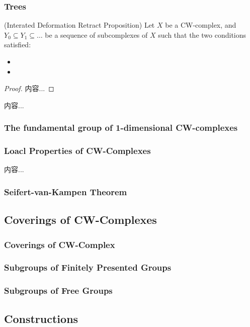 \documentclass[Total.tex]{subfiles}
\begin{document}
	\subsubsection{Trees}
	\begin{proposition}
		(Interated Deformation Retract Proposition) Let $X$ be a CW-complex, and $Y_0\subseteq Y_1\subseteq \dots$ be a sequence of subcomplexes of $X$ such that the two conditions satisfied:
		\begin{itemize}
			\item 
			\item 
		\end{itemize}
	\end{proposition}
	\begin{proof}
		内容...
	\end{proof}
	\begin{Def}
		内容...
	\end{Def}
	\subsubsection{The fundamental group of 1-dimensional CW-complexes}
	\subsubsection{Loacl Properties of CW-Complexes}
	\begin{proposition}
		内容...
	\end{proposition}
	\subsubsection{Seifert-van-Kampen Theorem}
	\subsection{Coverings of CW-Complexes}
	\subsubsection{Coverings of CW-Complex}
	\subsubsection{Subgroups of Finitely Presented Groups}
	\subsubsection{Subgroups of Free Groups}
	\subsection{Constructions}
\end{document}
